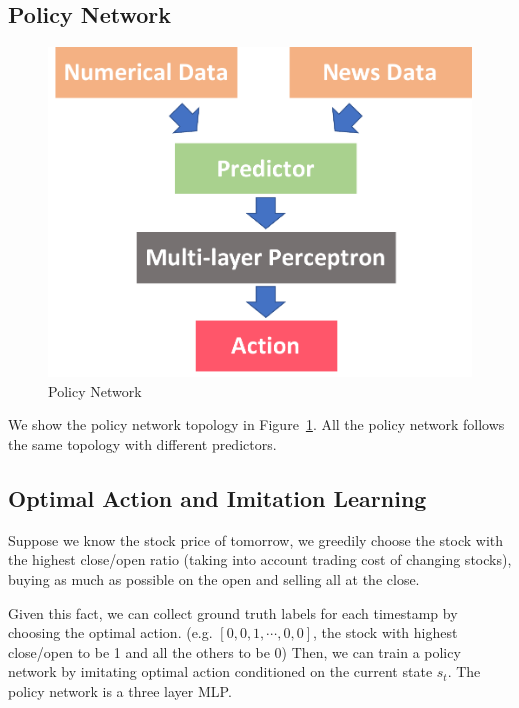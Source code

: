 \documentclass[a4paper, 10pt]{article}
\begin{document}
\begin{spacing}{1.2}
    \subsection{Policy Network}
    \begin{figure}
      \centering
      \includegraphics[scale=0.5]{actor}
      \caption{Policy Network}
      \label{fig:actor}
    \end{figure}
    We show the policy network topology in Figure~\ref{fig:actor}. All the policy network follows the same topology with different predictors.
    
    \subsection{Optimal Action and Imitation Learning}
    Suppose we know the stock price of tomorrow, we greedily choose the stock with the highest close/open ratio (taking into account trading cost of changing stocks), buying as much as possible on the open and selling all at the close.
    
    Given this fact, we can collect ground truth labels for each timestamp by choosing the optimal action. (e.g. $[0, 0, 1, \cdots, 0, 0]$, the stock with highest close/open to be 1 and all the others to be 0) Then, we can train a policy network by imitating optimal action conditioned on the current state $s_t$. The policy network is a three layer MLP.
    

\end{spacing}
\end{document}
